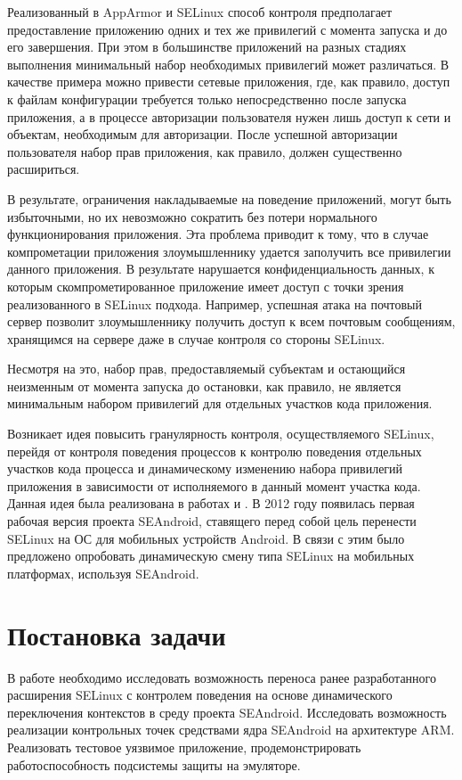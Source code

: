 Реализованный в AppArmor и SELinux способ контроля предполагает
предоставление приложению одних и тех же привилегий с момента
запуска и до его завершения. При этом в большинстве приложений
на разных стадиях выполнения минимальный набор необходимых
привилегий может различаться. В качестве примера можно привести
сетевые приложения, где, как правило, доступ к файлам конфигурации
требуется только непосредственно после запуска приложения,
а в процессе авторизации пользователя нужен лишь доступ к сети и
объектам, необходимым для авторизации. После успешной авторизации
пользователя набор прав приложения, как правило, должен существенно
расшириться.

В результате, ограничения накладываемые на поведение приложений,
могут быть избыточными, но их невозможно сократить без потери
нормального функционирования приложения. Эта проблема приводит
к тому, что в случае компрометации приложения злоумышленнику удается
заполучить все привилегии данного приложения. В результате нарушается
конфиденциальность данных, к которым скомпрометированное приложение
имеет доступ с точки зрения реализованного в SELinux подхода.
Например, успешная атака на почтовый сервер позволит злоумышленнику
получить доступ к всем почтовым сообщениям, хранящимся на сервере даже
в случае контроля со стороны SELinux.

Несмотря на это, набор прав, предоставляемый субъектам 
и остающийся неизменным от момента запуска до остановки,
как правило, не является минимальным набором привилегий
для отдельных участков кода приложения.

Возникает идея повысить гранулярность контроля, осуществляемого SELinux,
перейдя от контроля поведения процессов к контролю поведения отдельных
участков кода процесса и динамическому изменению набора привилегий
приложения в зависимости от исполняемого в данный момент участка кода.
Данная идея была реализована в работах \cite{sacharov} и \cite{bush}. В
2012 году появилась первая рабочая версия проекта SEAndroid, ставящего
перед собой цель перенести SELinux на ОС для мобильных устройств
Android. В связи с этим было предложено опробовать динамическую смену
типа SELinux на мобильных платформах, используя SEAndroid.
 
\newpage
\section{Постановка задачи}

В работе необходимо исследовать возможность переноса ранее
разработанного расширения SELinux с контролем поведения на основе
динамического переключения контекстов в среду проекта SEAndroid.
Исследовать возможность реализации контрольных точек средствами ядра
SEAndroid на архитектуре ARM. Реализовать тестовое уязвимое приложение,
продемонстрировать работоспособность подсистемы защиты на эмуляторе.

